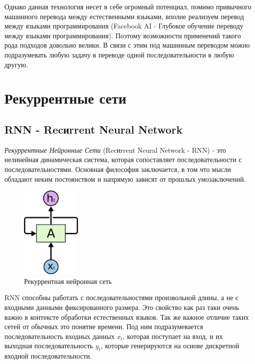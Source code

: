 	Однако данная технология несет в себе огромный потенциал, помимо привычного машинного перевода между естественными языками, вполне реализуем перевод между языками программирования (Facebook AI - Глубокое обучение переводу между языками программирования). Поэтому возможности применений такого рода подходов довольно велики. В связи с этим под машинным переводом можно подразумевать любую задачу в переводе одной последовательности в любую другую.
	
	\clearpage
	
	\section{Рекуррентные сети}
	
	\subsection{RNN - Recиrrent Neural Network}
	
	\textit{Рекуррентные Нейронные Сети} (Recиrrent Neural Network - RNN) - это нелинейная динамическая система, которая сопоставляет последовательности с последовательностями. Основная философия заключается, в том что мысли обладают неким постоянством и напрямую зависят от прошлых умозаключений. 
	
	\begin{figure}
		\centering
		\captionsetup{justification=centering}
		\includegraphics[height=45mm]{img/2.png}
		\caption{Рекуррентная нейронная сеть}
	\end{figure}
	
	RNN способны работать с последовательностями произвольной длины, а не с входными данными фиксированного размера. Это свойство как раз таки очень важно в контексте обработки естественных языков. Так же важное отличие таких сетей от обычных это понятие времени. Под ним подразумевается последовательность входных данных $x_t$, которая поступает на вход, и их выходная последовательность $y_t$, которые генерируются на основе дискретной входной последовательности. 
	
